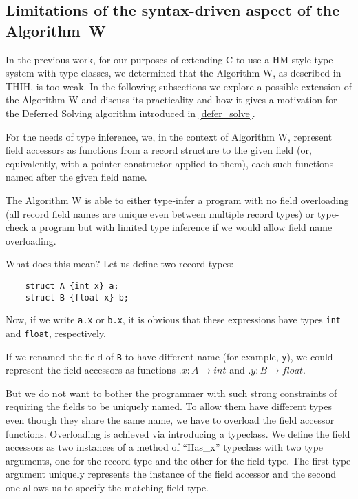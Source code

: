 \subsection{Limitations of the syntax-driven aspect of the Algorithm~W}
\label{ex_structs}

In the previous work, for our purposes of extending C to use a HM-style type system with type classes, we determined that the Algorithm W, as described in THIH, is too weak. In the following subsections we explore a possible extension of the Algorithm W and discuss its practicality and how it gives a motivation for the Deferred Solving algorithm introduced in \cref{defer_solve}.

\begin{remark}
    For the needs of type inference, we, in the context of Algorithm W, represent field accessors as functions from a record structure to the given field (or, equivalently, with a pointer constructor applied to them), each such functions named after the given field name.
\end{remark}

The Algorithm W is able to either type-infer a program with no field overloading (all record field names are unique even between multiple record types) or type-check a program but with limited type inference if we would allow field name overloading.

What does this mean? Let us define two record types:

\begin{lstlisting}
    struct A {int x} a;
    struct B {float x} b;
\end{lstlisting}

Now, if we write \lstinline{a.x} or \lstinline{b.x}, it is obvious that these expressions have types \lstinline{int} and \lstinline{float}, respectively.

If we renamed the field of \lstinline{B} to have different name (for example, \lstinline{y}), we could represent the field accessors as functions $.x : A \to int$ and $.y : B \to float$.

But we do not want to bother the programmer with such strong constraints of requiring the fields to be uniquely named. To allow them have different types even though they share the same name, we have to overload the field accessor functions. Overloading is achieved via introducing a typeclass. We define the field accessors as two instances of a method  of ``Has\_x'' typeclass with two type arguments, one for the record type and the other for the field type. The first type argument uniquely represents the instance of the field accessor and the second one allows us to specify the matching field type.

